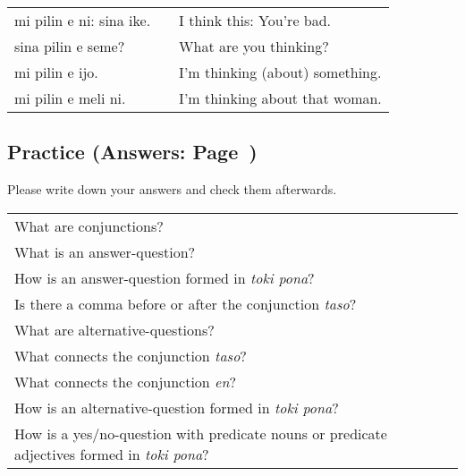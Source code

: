 \begin{supertabular}{p{5,5cm}|ll}
    mi pilin e ni: sina ike. &  & I think this: You're bad.       \\
    sina pilin e seme?       &  & What are you thinking?          \\
    mi pilin e ijo.          &  & I'm thinking (about) something. \\
    mi pilin e meli ni.      &  & I'm thinking about that woman.  \\
\end{supertabular}

\newpage

\subsection*{Practice (Answers: Page~\pageref{'conjunctions_temperature'})}
Please write down your answers and check them afterwards.

\begin{supertabular}{p{5,5cm}|ll}
    What are conjunctions?                                                                              &  & \\
    What is an answer-question?                                                                         &  & \\
    How is an answer-question formed in \textit{toki pona}?                                             &  & \\
    Is there a comma before or after the conjunction \textit{taso}?                                     &  & \\
    What are alternative-questions?                                                                     &  & \\
    What connects the conjunction \textit{taso}?                                                        &  & \\
    What connects the conjunction \textit{en}?                                                          &  & \\
    How is an alternative-question formed in \textit{toki pona}?                                        &  & \\
    How is a yes/no-question with predicate nouns or predicate adjectives formed in \textit{toki pona}? &  & \\
\end{supertabular}

